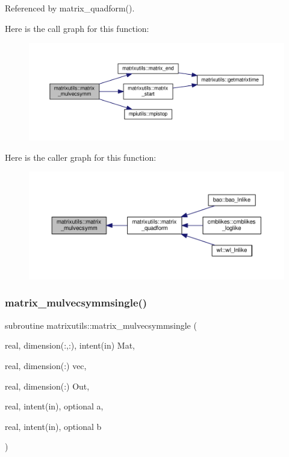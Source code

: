Referenced by matrix\+\_\+quadform().

Here is the call graph for this function\+:
\nopagebreak
\begin{figure}[H]
\begin{center}
\leavevmode
\includegraphics[width=350pt]{namespacematrixutils_a4bcc2b4fc8b6f2fee0c142c280851c73_cgraph}
\end{center}
\end{figure}
Here is the caller graph for this function\+:
\nopagebreak
\begin{figure}[H]
\begin{center}
\leavevmode
\includegraphics[width=350pt]{namespacematrixutils_a4bcc2b4fc8b6f2fee0c142c280851c73_icgraph}
\end{center}
\end{figure}
\mbox{\label{namespacematrixutils_a83ffeb3e4788ff67e17e5f94b70bec3a}} 
\subsubsection{\texorpdfstring{matrix\+\_\+mulvecsymmsingle()}{matrix\_mulvecsymmsingle()}}
{\footnotesize\ttfamily subroutine matrixutils\+::matrix\+\_\+mulvecsymmsingle (\begin{DoxyParamCaption}\item[{real, dimension(\+:,\+:), intent(in)}]{Mat,  }\item[{real, dimension(\+:)}]{vec,  }\item[{real, dimension(\+:)}]{Out,  }\item[{real, intent(in), optional}]{a,  }\item[{real, intent(in), optional}]{b }\end{DoxyParamCaption})}



